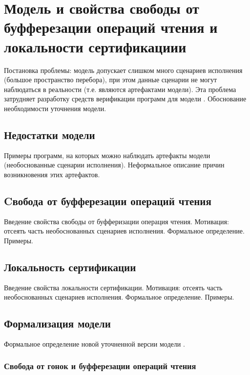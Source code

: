 \chapter{Модель \WkmS и свойства свободы от буфферезации операций чтения и локальности сертификациии}
\label{ch:weakestmo2}

Постановка проблемы: модель \Wkm допускает слишком много
сценариев исполнения (большое пространство перебора),
при этом данные сценарии не могут наблюдаться в реальности
(т.е. являются артефактами модели).
Эта проблема затрудняет разработку средств верификации
программ для модели \Wkm. 
Обоснование необходимости уточнения модели.

\section{Недостатки модели \Wkm}

Примеры программ, на которых можно наблюдать
артефакты модели \Wkm (необоснованные сценарии исполнения).
Неформальное описание причин возникновения этих артефактов. 

\section{Cвобода от буфферезации операций чтения}

Введение свойства свободы от буфферизации операция чтения.
Мотивация: отсеять часть необоснованных сценариев исполнения.
Формальное определение. Примеры. 

\section{Локальность сертификации}

Введение свойства локальности сертификации.
Мотивация: отсеять часть необоснованных сценариев исполнения.
Формальное определение. Примеры. 

\section{Формализация модели \WkmS}

Формальное определение новой уточненной версии модели \WkmS.

\subsection{Свобода от гонок и буфферезации операций чтения}

